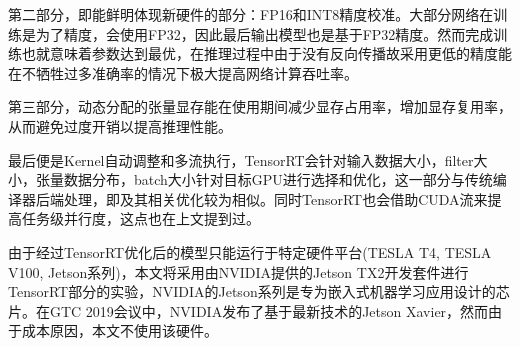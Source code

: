 \par 第二部分，即能鲜明体现新硬件的部分：FP16和INT8精度校准。大部分网络在训练是为了精度，会使用FP32，因此最后输出模型也是基于FP32精度。然而完成训练也就意味着参数达到最优，在推理过程中由于没有反向传播故采用更低的精度能在不牺牲过多准确率的情况下极大提高网络计算吞吐率。
\par 第三部分，动态分配的张量显存能在使用期间减少显存占用率，增加显存复用率，从而避免过度开销以提高推理性能。
\par 最后便是Kernel自动调整和多流执行，TensorRT会针对输入数据大小，filter大小，张量数据分布，batch大小针对目标GPU进行选择和优化，这一部分与传统编译器后端处理，即及其相关优化较为相似。同时TensorRT也会借助CUDA流来提高任务级并行度，这点也在上文提到过。
\par 由于经过TensorRT优化后的模型只能运行于特定硬件平台(TESLA T4, TESLA V100, Jetson系列)\parencite{TENSORRTDOC}，本文将采用由NVIDIA提供的Jetson TX2开发套件进行TensorRT部分的实验，NVIDIA的Jetson系列是专为嵌入式机器学习应用设计的芯片。在GTC 2019会议中，NVIDIA发布了基于最新技术的Jetson Xavier，然而由于成本原因，本文不使用该硬件。